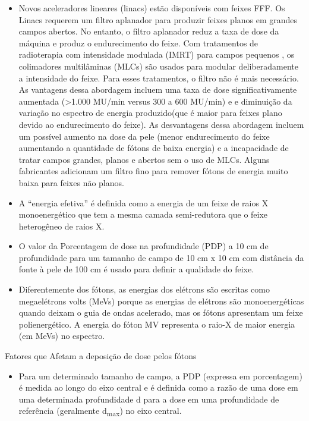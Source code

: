 \documentclass[11pt,a4paper]{article}
\newcounter{exemplo}
\begin{document}
\begin{exemplo}
\begin{itemize}
        \item Novos aceleradores lineares (linacs) estão disponíveis com feixes FFF. Os Linacs requerem um filtro aplanador para produzir feixes planos em grandes campos abertos. No entanto, o filtro aplanador reduz a taxa de dose da máquina e produz o endurecimento do feixe. Com tratamentos de radioterapia com intensidade modulada (IMRT) para campos pequenos , os colimadores multilâminas (MLCs) são usados para modular deliberadamente a intensidade do feixe. Para esses tratamentos, o filtro não é mais necessário. As vantagens dessa abordagem incluem uma taxa de dose significativamente aumentada (>1.000 MU/min versus 300 a 600 MU/min) e e diminuição da variação no espectro de energia produzido(que é maior para feixes plano devido ao endurecimento do feixe). As desvantagens dessa abordagem incluem um possível aumento na dose da pele (menor endurecimento do feixe aumentando a quantidade de fótons de baixa energia) e a incapacidade de tratar campos grandes, planos e abertos sem o uso de MLCs. Alguns fabricantes adicionam um filtro fino para remover fótons de energia muito baixa para feixes não planos.
        
        \item A “energia efetiva” é definida como a energia de um feixe de raios X monoenergético que tem a mesma camada semi-redutora que o feixe heterogêneo de raios X.
        
        \item O valor da Porcentagem de dose na profundidade (PDP) a 10 cm de profundidade para um tamanho de campo de 10 cm x 10 cm com distância da fonte à pele de 100 cm é usado para definir a qualidade do feixe.
        
        \item Diferentemente dos fótons, as energias dos elétrons são escritas como megaelétrons volts (MeVs) porque as energias de elétrons são monoenergéticas quando deixam o guia de ondas acelerado, mas os fótons apresentam um feixe polienergético. A energia do fóton MV representa o raio-X de maior energia (em MeVs) no espectro.

    \end{itemize}

    \textcolor{CarnationPink}{Fatores que Afetam a deposição de dose pelos fótons}
    \begin{itemize}
        \item Para um determinado tamanho de campo, a PDP (expressa em porcentagem) é medida ao longo do eixo central e é definida como a razão de uma dose em uma determinada profundidade d para a dose em uma profundidade de referência (geralmente d\textsubscript{max}) no eixo central.
        

\end{itemize}
\end{exemplo}
\end{document}
